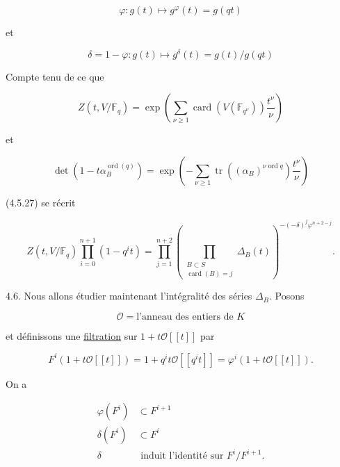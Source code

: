 \begin{equation}\tag{4.5.29}
\varphi:g(t)\longmapsto g^\varphi(t)=g(qt)
\end{equation}

et

\begin{equation}\tag{4.5.30}
\delta=1-\varphi:g(t)\longmapsto
g^\delta(t)=g(t)/g(qt)
\end{equation}


Compte tenu de ce que

\begin{equation}\tag{4.5.31}
Z(t,V/\mathbb F_q)
=\exp\!\left(
\sum_{\nu\geq1}\operatorname{card}(V(\mathbb F_{q^\nu}))
\frac{t^\nu}{\nu}\right)
\end{equation}

et

\begin{equation}\tag{4.5.32}
\det\!\left(1-t\alpha_B^{\operatorname{ord}(q)}\right)
=\exp\!\left(
-\sum_{\nu\geq1}
\operatorname{tr}\!\left((\alpha_B)^{\nu\operatorname{ord}q}\right)
\frac{t^\nu}{\nu}\right)
\end{equation}

(4.5.27) se récrit

\begin{equation}\tag{4.5.33}
Z(t,V/\mathbb F_q)\prod_{i=0}^{n+1}(1-q^it)
=\prod_{j=1}^{n+2}
\left(
\prod_{\substack{B\subset S\\\operatorname{card}(B)=j}}
\Delta_B(t)
\right)^{-(-\delta)^j\varphi^{n+2-j}}.
\end{equation}

4.6. Nous allons étudier maintenant l'intégralité des séries $\Delta_B$.
Posons

\begin{equation}\tag{4.6.1}
\mathcal O=\text{l'anneau des entiers de $K$}
\end{equation}

et définissons une \underline{filtration} sur $1+t\mathcal O[[t]]$ par

\begin{equation}\tag{4.6.2}
F^i(1+t\mathcal O[[t]])
=1+q^it\mathcal O[[q^it]]
=\varphi^i(1+t\mathcal O[[t]]).
\end{equation}

On a

\begin{align}
\varphi(F^i)&\subset F^{i+1} \tag{4.6.3}\\
\delta(F^i)&\subset F^i \tag{4.6.4}\\
\delta&\text{ induit l'identité sur }F^i/F^{i+1}. \tag{4.6.5}
\end{align}

